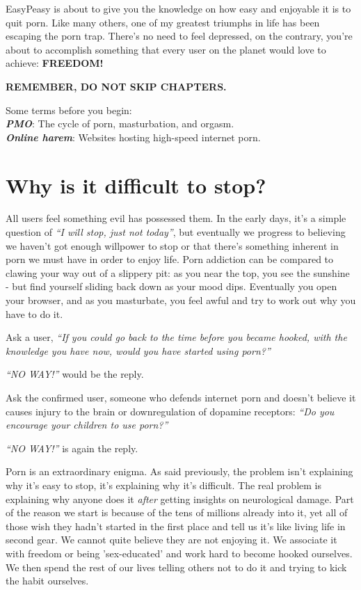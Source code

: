 \documentclass[
]{book}
\begin{document}
EasyPeasy is about to give you the knowledge on how easy and enjoyable it is to quit porn. Like many others, one of my greatest triumphs in life has been escaping the porn trap. There's no need to feel depressed, on the contrary, you're about to accomplish something that every user on the planet would love to achieve: \textbf{FREEDOM!}

\textbf{REMEMBER, DO NOT SKIP CHAPTERS.}

Some terms before you begin:\\
\textbf{\emph{PMO}}: The cycle of porn, masturbation, and orgasm.\\
\textbf{\emph{Online harem}}: Websites hosting high-speed internet porn.

\hypertarget{why-is-it-difficult-to-stop}{%
\chapter{Why is it difficult to stop?}\label{why-is-it-difficult-to-stop}}

All users feel something evil has possessed them. In the early days, it's a simple question of \emph{``I will stop, just not today''}, but eventually we progress to believing we haven't got enough willpower to stop or that there's something inherent in porn we must have in order to enjoy life. Porn addiction can be compared to clawing your way out of a slippery pit: as you near the top, you see the sunshine - but find yourself sliding back down as your mood dips. Eventually you open your browser, and as you masturbate, you feel awful and try to work out why you have to do it.

Ask a user, \emph{``If you could go back to the time before you became hooked, with the knowledge you have now, would you have started using porn?''}

\emph{``NO WAY!''} would be the reply.

Ask the confirmed user, someone who defends internet porn and doesn't believe it causes injury to the brain or downregulation of dopamine receptors: \emph{``Do you encourage your children to use porn?''}

\emph{``NO WAY!''} is again the reply.

Porn is an extraordinary enigma. As said previously, the problem isn't explaining why it's easy to stop, it's explaining why it's difficult. The real problem is explaining why anyone does it \emph{after} getting insights on neurological damage. Part of the reason we start is because of the tens of millions already into it, yet all of those wish they hadn't started in the first place and tell us it's like living life in second gear. We cannot quite believe they are not enjoying it. We associate it with freedom or being 'sex-educated' and work hard to become hooked ourselves. We then spend the rest of our lives telling others not to do it and trying to kick the habit ourselves.
\end{document}
